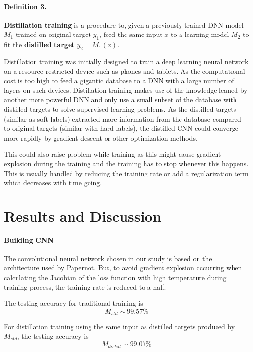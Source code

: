\documentclass{article}
\begin{document}
\paragraph{Definition 3.} 
\textbf{Distillation training} is a procedure to, given a previously trained DNN model $M_1$ trained on original target $y_1$, feed the same input $x$ to a learning model $M_2$ to fit the \textbf{distilled target} $y_2=M_1(x)$.\cite{Ba}

Distillation training was initially designed to train a deep learning neural network on a resource restricted device such as phones and tablets. As the computational cost is too high to feed a gigantic database to a DNN with a large number of layers on such devices. 
Distillation training makes use of the knowledge leaned by another more powerful DNN and only use a small subset of the database with distilled targets to solve supervised learning problems.
As the distilled targets (similar as soft labels) extracted more information from the database compared to original targets (similar with hard labels), the distilled CNN could converge more rapidly by gradient descent or other optimization methods.

This could also raise problem while training as this might cause gradient explosion during the training and the training has to stop whenever this happens. This is usually handled by reducing the training rate or add a regularization term which decreases with time going.

\section{Results and Discussion}

\paragraph{Building CNN}The convolutional neural network chosen in our study is based on the architecture used by Papernot\cite{Papernot}.
 But, to avoid gradient explosion occurring when calculating the Jacobian of the loss function with high temperature during training process, the training rate is reduced to a half.

The testing accuracy for traditional training is \\
\begin{equation}
M_{std} \sim  99.57\%
\end{equation}

For distillation training using the same input as distilled targets produced by $M_{std}$, the testing accuracy is \\
\begin{equation}
M_{distill} \sim 99.07\%
\end{equation}
\end{document}
